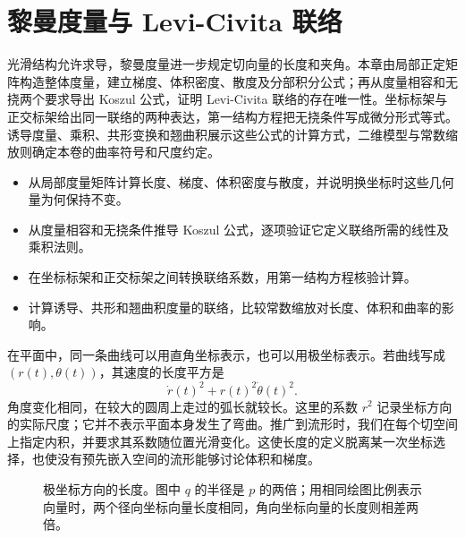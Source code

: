 
% 
% 

\chapter{黎曼度量与 Levi-Civita 联络}
\label{g3:ch:01}

\begin{chapterabstract}
	光滑结构允许求导，黎曼度量进一步规定切向量的长度和夹角。本章由局部正定矩阵构造整体度量，建立梯度、体积密度、散度及分部积分公式；再从度量相容和无挠两个要求导出 Koszul 公式，证明 Levi-Civita 联络的存在唯一性。坐标标架与正交标架给出同一联络的两种表达，第一结构方程把无挠条件写成微分形式等式。诱导度量、乘积、共形变换和翘曲积展示这些公式的计算方式，二维模型与常数缩放则确定本卷的曲率符号和尺度约定。
\end{chapterabstract}

\begin{learninggoals}
	\begin{itemize}
		\item 从局部度量矩阵计算长度、梯度、体积密度与散度，并说明换坐标时这些几何量为何保持不变。
		\item 从度量相容和无挠条件推导 Koszul 公式，逐项验证它定义联络所需的线性及乘积法则。
		\item 在坐标标架和正交标架之间转换联络系数，用第一结构方程核验计算。
		\item 计算诱导、共形和翘曲积度量的联络，比较常数缩放对长度、体积和曲率的影响。
	\end{itemize}
\end{learninggoals}

在平面中，同一条曲线可以用直角坐标表示，也可以用极坐标表示。若曲线写成 \((r(t),\theta(t))\)，其速度的长度平方是
\[
	\dot r(t)^2+r(t)^2\dot\theta(t)^2.
\]
角度变化相同，在较大的圆周上走过的弧长就较长。这里的系数 \(r^2\) 记录坐标方向的实际尺度；它并不表示平面本身发生了弯曲。推广到流形时，我们在每个切空间上指定内积，并要求其系数随位置光滑变化。这使长度的定义脱离某一次坐标选择，也使没有预先嵌入空间的流形能够讨论体积和梯度。

\begin{figure}[htbp]
	\centering
	
	\caption[极坐标方向的长度]{极坐标方向的长度。图中 \(q\) 的半径是 \(p\) 的两倍；用相同绘图比例表示向量时，两个径向坐标向量长度相同，角向坐标向量的长度则相差两倍。}
	\label{g3:fig:polar-coordinate-vectors}
\end{figure}


